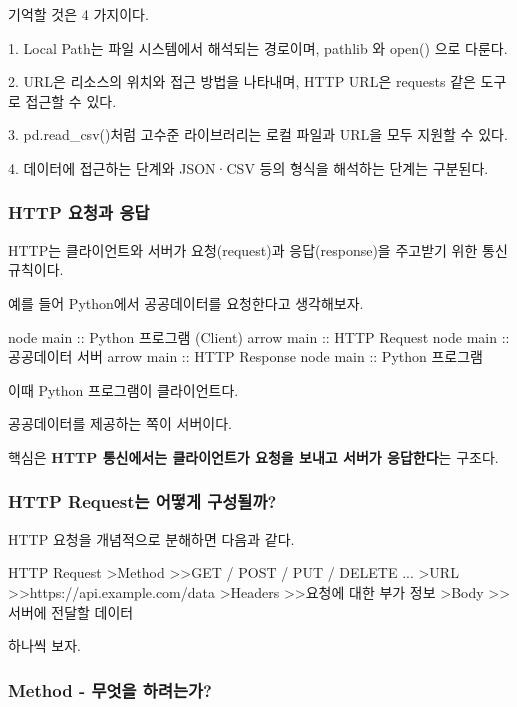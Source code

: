 기억할 것은 4 가지이다.

\begin{dhksmry}
    1. Local Path는 파일 시스템에서 해석되는 경로이며,
        pathlib 와 open() 으로 다룬다.
    

    2. URL은 리소스의 위치와 접근 방법을 나타내며,
        HTTP URL은 requests 같은 도구로 접근할 수 있다.
    

    3. pd.read_csv()처럼 고수준 라이브러리는 
        로컬 파일과 URL을 모두 지원할 수 있다.


    4. 데이터에 접근하는 단계와 JSON·CSV 등의 형식을 해석하는 단계는 구분된다.
\end{dhksmry}

\subsubsection{HTTP 요청과 응답}

HTTP는 클라이언트와 서버가 요청(request)과 응답(response)을 주고받기 위한 통신 규칙이다.

예를 들어 Python에서 공공데이터를 요청한다고 생각해보자.

\begin{dhkbranch}[in=8]
node main :: Python 프로그램 (Client)
arrow main :: HTTP Request
node main :: 공공데이터 서버
arrow main :: HTTP Response
node main :: Python 프로그램
\end{dhkbranch}

이때 Python 프로그램이 클라이언트다.

공공데이터를 제공하는 쪽이 서버이다.

핵심은 \textbf{HTTP 통신에서는 클라이언트가 요청을 보내고 서버가 응답한다}는 구조다.

\subsubsection{HTTP Request는 어떻게 구성될까?}

HTTP 요청을 개념적으로 분해하면 다음과 같다.

\begin{dhkdir}
HTTP Request
>Method
>>GET / POST / PUT / DELETE ...
>URL
>>https://api.example.com/data
>Headers
>>요청에 대한 부가 정보
>Body
>>서버에 전달할 데이터
\end{dhkdir}

하나씩 보자.

\subsubsection{Method - 무엇을 하려는가?}

